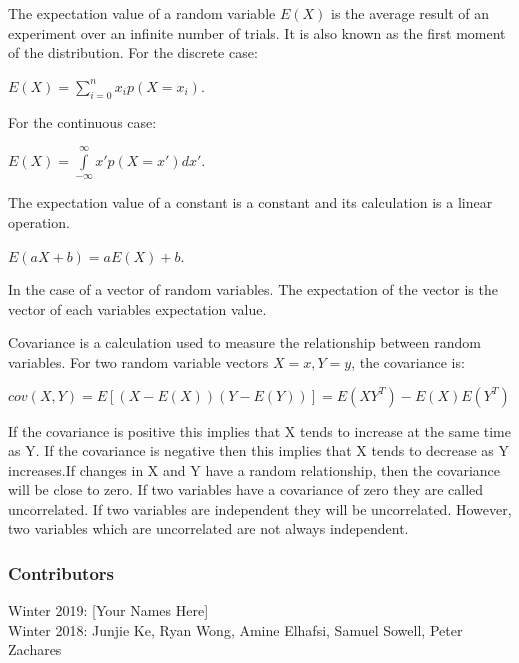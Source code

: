 \documentclass[twoside]{article}
\begin{document}
The expectation value of a random variable $E(X)$ is the average result of an experiment over an infinite number of trials. It is also known as the first moment of the distribution. For the discrete case:

\begin{center}
$E(X)= \sum\limits_{i = 0}^{n} x_ip(X=x_i)$.
\end{center}

For the continuous case:

\begin{center}
$E(X)= \int\limits_{-\infty}^{\infty}  x'p(X=x')dx'$.
\end{center}

The expectation value of a constant is a constant and its calculation is a linear operation.

\begin{center}
$E(aX + b)= aE(X) + b$.
\end{center}

In the case of a vector of random variables. The expectation of the vector is the vector of each variables expectation value.

Covariance is a calculation used to measure the relationship between random variables. For two random variable vectors $X=x, Y=y$, the covariance is:

\begin{center}
$cov(X,Y)=E[(X-E(X))(Y-E(Y))] = E(XY^T) - E(X)E(Y^T)$
\end{center}

If the covariance is positive this implies that X tends to increase at the same time as Y. If the covariance is negative then this implies that X tends to decrease as Y increases.If changes in X and Y have a random relationship, then the covariance will be close to zero. If two variables have a covariance of zero they are called uncorrelated. If two variables are independent they will be uncorrelated. However, two variables which are uncorrelated are not always independent.




\subsubsection*{Contributors}
Winter 2019: [Your Names Here]
\\
Winter 2018: Junjie Ke, Ryan Wong, Amine Elhafsi, Samuel Sowell, Peter Zachares
\end{document}
